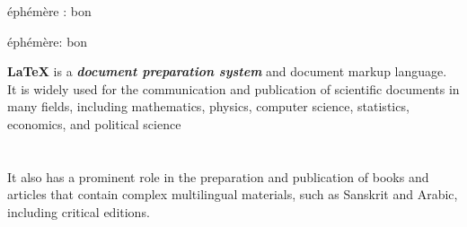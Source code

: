 \documentclass{report}
\begin{document}
éphémère : bon %

éphémère: bon %

\textbf{LaTeX} is a \textbf{\textit{document preparation system}} and document markup language. It is widely used for the communication and publication of scientific documents in many fields, including mathematics, physics, computer science, statistics, economics, and political science 
\\ %
\\ %
\\ %

It also has a prominent role in the preparation and publication of books and articles that contain complex multilingual materials, such as Sanskrit and Arabic, including critical editions.  

\color{red}{texte en couleur}
\end{document}
